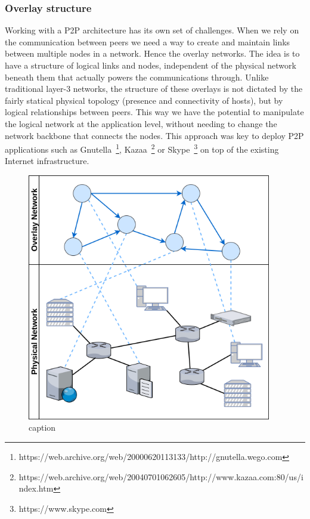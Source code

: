 \subsubsection{Overlay structure}\label{overlay-structure}

Working with a P2P architecture has its own set of challenges. When we
rely on the communication between peers we need a way to create and
maintain links between multiple nodes in a network. Hence the overlay
networks. The idea is to have a structure of logical links and nodes,
independent of the physical network beneath them that actually powers
the communications through. Unlike traditional layer-3 networks, the
structure of these overlays is not dictated by the fairly statical
physical topology (presence and connectivity of hosts), but by logical
relationships between peers. This way we have the potential to
manipulate the logical network at the application level, without needing
to change the network backbone that connects the nodes. This approach
was key to deploy P2P applications such as Gnutella~\footnote{https://web.archive.org/web/20000620113133/http://gnutella.wego.com},
Kazaa~\footnote{https://web.archive.org/web/20040701062605/http://www.kazaa.com:80/us/index.htm}
or Skype~\footnote{https://www.skype.com} on top of the existing Internet infrastructure.

\begin{figure}[hb!]
  \centering
  \includegraphics[width=0.95\textwidth]{img/overlay-vs-physical.png}
  \caption{caption}
  \label{fig:overlay-vs-physical}
\end{figure}

